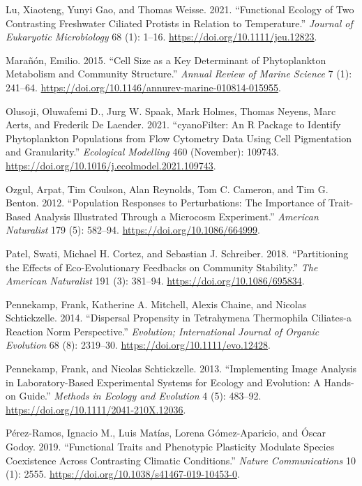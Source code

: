 \documentclass[
  letterpaper,
  DIV=11,
  numbers=noendperiod]{scrartcl}
\begin{document}
\begin{CSLReferences}
Lu, Xiaoteng, Yunyi Gao, and Thomas Weisse. 2021. {``Functional Ecology
of Two Contrasting Freshwater Ciliated Protists in Relation to
Temperature.''} \emph{Journal of Eukaryotic Microbiology} 68 (1): 1--16.
\url{https://doi.org/10.1111/jeu.12823}.

Marañón, Emilio. 2015. {``Cell {Size} as a {Key Determinant} of
{Phytoplankton Metabolism} and {Community Structure}.''} \emph{Annual
Review of Marine Science} 7 (1): 241--64.
\url{https://doi.org/10.1146/annurev-marine-010814-015955}.

Olusoji, Oluwafemi D., Jurg W. Spaak, Mark Holmes, Thomas Neyens, Marc
Aerts, and Frederik De Laender. 2021. {``{cyanoFilter}: {An R} Package
to Identify Phytoplankton Populations from Flow Cytometry Data Using
Cell Pigmentation and Granularity.''} \emph{Ecological Modelling} 460
(November): 109743.
\url{https://doi.org/10.1016/j.ecolmodel.2021.109743}.

Ozgul, Arpat, Tim Coulson, Alan Reynolds, Tom C. Cameron, and Tim G.
Benton. 2012. {``Population Responses to Perturbations: {The} Importance
of Trait-Based Analysis Illustrated Through a Microcosm Experiment.''}
\emph{American Naturalist} 179 (5): 582--94.
\url{https://doi.org/10.1086/664999}.

Patel, Swati, Michael H. Cortez, and Sebastian J. Schreiber. 2018.
{``Partitioning the {Effects} of {Eco-Evolutionary Feedbacks} on
{Community Stability}.''} \emph{The American Naturalist} 191 (3):
381--94. \url{https://doi.org/10.1086/695834}.

Pennekamp, Frank, Katherine A. Mitchell, Alexis Chaine, and Nicolas
Schtickzelle. 2014. {``Dispersal Propensity in Tetrahymena Thermophila
Ciliates-a Reaction Norm Perspective.''} \emph{Evolution; International
Journal of Organic Evolution} 68 (8): 2319--30.
\url{https://doi.org/10.1111/evo.12428}.

Pennekamp, Frank, and Nicolas Schtickzelle. 2013. {``Implementing Image
Analysis in Laboratory-Based Experimental Systems for Ecology and
Evolution: {A} Hands-on Guide.''} \emph{Methods in Ecology and
Evolution} 4 (5): 483--92.
\url{https://doi.org/10.1111/2041-210X.12036}.

Pérez-Ramos, Ignacio M., Luis Matías, Lorena Gómez-Aparicio, and Óscar
Godoy. 2019. {``Functional Traits and Phenotypic Plasticity Modulate
Species Coexistence Across Contrasting Climatic Conditions.''}
\emph{Nature Communications} 10 (1): 2555.
\url{https://doi.org/10.1038/s41467-019-10453-0}.


\end{CSLReferences}
\end{document}
